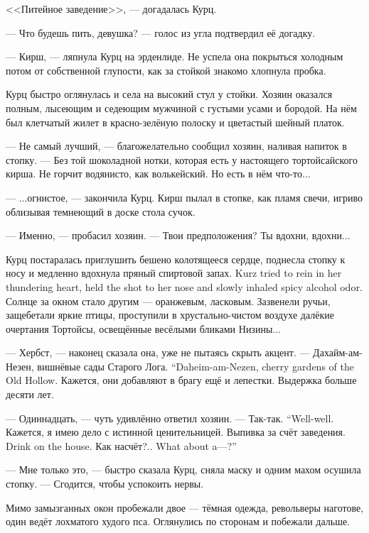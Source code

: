<<Питейное заведение>>, --- догадалась Курц.

--- Что будешь пить, девушка? --- голос из угла подтвердил её догадку.

--- Кирш, --- ляпнула Курц на эрденлиде.
Не успела она покрыться холодным потом от собственной глупости, как за стойкой знакомо хлопнула пробка.

Курц быстро оглянулась и села на высокий стул у стойки.
Хозяин оказался полным, лысеющим и седеющим мужчиной с густыми усами и бородой.
На нём был клетчатый жилет в красно-зелёную полоску и цветастый шейный платок.

--- Не самый лучший, --- благожелательно сообщил хозяин, наливая напиток в стопку.
--- Без той шоколадной нотки, которая есть у настоящего тортойсайского кирша.
Не горчит водянисто, как волькейский.
Но есть в нём что-то...

--- ...огнистое, --- закончила Курц.
Кирш пылал в стопке, как пламя свечи, игриво облизывая темнеющий в доске стола сучок.

--- Именно, --- пробасил хозяин.
--- Твои предположения?
Ты вдохни, вдохни...

{Курц постаралась приглушить бешено колотящееся сердце, поднесла стопку к носу и медленно вдохнула пряный спиртовой запах.}
{Kurz tried to rein in her thundering heart, held the shot to her nose and slowly inhaled spicy alcohol odor.}
Солнце за окном стало другим --- оранжевым, ласковым.
Зазвенели ручьи, защебетали яркие птицы, проступили в хрустально-чистом воздухе далёкие очертания Тортойсы, освещённые весёлыми бликами Низины...

--- Хербст, --- наконец сказала она, уже не пытаясь скрыть акцент.
{--- Дахайм-ам-Незен, вишнёвые сады Старого Лога.}
{``Daheim-am-Nezen, cherry gardens of the Old Hollow.}
Кажется, они добавляют в брагу ещё и лепестки.
Выдержка больше десяти лет.

--- Одиннадцать, --- чуть удивлённо ответил хозяин.
{--- Так-так.}
{``Well-well.}
Кажется, я имею дело с истинной ценительницей.
{Выпивка за счёт заведения.}
{Drink on the house.}
{Как насчёт?..}
{What about a---?''}

--- Мне только это, --- быстро сказала Курц, сняла маску и одним махом осушила стопку.
--- Сгодится, чтобы успокоить нервы.

Мимо замызганных окон пробежали двое --- тёмная одежда, револьверы наготове, один ведёт лохматого худого пса.
Оглянулись по сторонам и побежали дальше.

